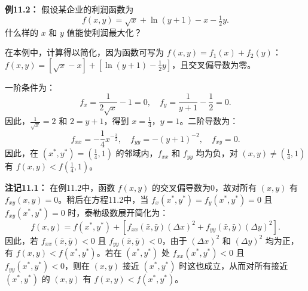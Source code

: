 \begin{translation}
\textbf{例11.2：} 假设某企业的利润函数为
\[
f(x, y) = \sqrt{x} + \ln(y+1) - x - \tfrac{1}{2}y.
\]
什么样的 $x$ 和 $y$ 值能使利润最大化？

在本例中，计算得以简化，因为函数可写为 $f(x, y) = f_1(x) + f_2(y)$：$f(x, y) = [\sqrt{x} - x] + [\ln(y+1) - \frac{1}{2}y]$，且交叉偏导数为零。

一阶条件为：
\[
f_x = \frac{1}{2\sqrt{x}} - 1 = 0, \quad f_y = \frac{1}{y+1} - \frac{1}{2} = 0.
\]
因此，$\frac{1}{\sqrt{x}} = 2$ 和 $2 = y+1$，得到 $x = \frac{1}{4}$，$y = 1$。二阶导数为：
\[
f_{xx} = -\frac{1}{4}x^{-\frac{3}{2}}, \quad f_{yy} = -(y+1)^{-2}, \quad f_{xy} = 0.
\]
因此，在 $(x^*, y^*) = (\frac{1}{4}, 1)$ 的邻域内，$f_{xx}$ 和 $f_{yy}$ 均为负，对 $(x, y) \neq (\frac{1}{4}, 1)$ 有 $f(x, y) < f(\frac{1}{4}, 1)$。

\textbf{注记11.1：} 在例11.2中，函数 $f(x, y)$ 的交叉偏导数为0，故对所有 $(x, y)$ 有 $f_{xy}(x, y) = 0$。稍后在方程11.2中，当 $f_x(x^*, y^*) = f_y(x^*, y^*) = 0$ 且 $f_{xy}(x^*, y^*) = 0$ 时，泰勒级数展开简化为：
\[
f(x, y) = f(x^*, y^*) + [f_{xx}(\bar{x}, \bar{y})(\Delta x)^2 + f_{yy}(\bar{x}, \bar{y})(\Delta y)^2].
\]
因此，若 $f_{xx}(\bar{x}, \bar{y}) < 0$ 且 $f_{yy}(\bar{x}, \bar{y}) < 0$，由于 $(\Delta x)^2$ 和 $(\Delta y)^2$ 均为正，有 $f(x, y) < f(x^*, y^*)$。若在 $(x^*, y^*)$ 处 $f_{xx}(x^*, y^*) < 0$ 且 $f_{yy}(x^*, y^*) < 0$，则在 $(x, y)$ 接近 $(x^*, y^*)$ 时这也成立，从而对所有接近 $(x^*, y^*)$ 的 $(x, y)$ 有 $f(x, y) < f(x^*, y^*)$。
\end{translation}

